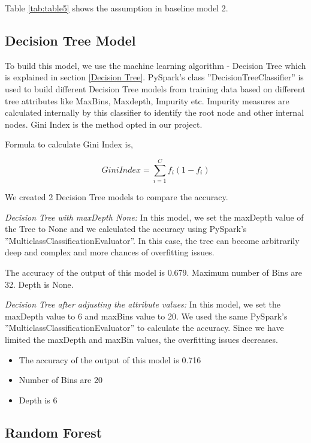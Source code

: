 \documentclass[sigconf]{acmart}
\begin{document}
Table \ref{tab:table5} shows the assumption in baseline model 2.

\subsection{Decision Tree Model}

To build this model, we use the machine learning algorithm - Decision Tree which is explained in section \ref{Decision Tree}. PySpark's class ''DecisionTreeClassifier'' is used to build different Decision Tree models from training data based on different tree attributes like MaxBins, Maxdepth, Impurity etc. Impurity measures are calculated internally by this classifier to identify the root node and other internal nodes. Gini Index is the method opted in our project.

Formula to calculate Gini Index is,

\begin{equation}
Gini Index = \sum_{i=1}^Cf_i(1-{f_i})
\end{equation}

We created 2 Decision Tree models to compare the accuracy.

\textit{Decision Tree with maxDepth None:} In this model, we set the maxDepth value of the Tree to None and we calculated the accuracy using PySpark's ''MulticlassClassificationEvaluator''. In this case, the tree can become arbitrarily deep and complex and more chances of overfitting issues.

The accuracy of the output of this model is 0.679. Maximum number of Bins are 32. Depth is None.

\textit{Decision Tree after adjusting the attribute values:} In this model, we set the maxDepth value to 6 and maxBins value to 20. We used the same PySpark's ''MulticlassClassificationEvaluator'' to calculate the accuracy. Since we have limited the maxDepth and maxBin values, the overfitting issues decreases.

\begin{itemize}
   \item The accuracy of the output of this model is 0.716
   \item Number of Bins are 20
   \item Depth is 6
\end{itemize}

\subsection{Random Forest}
\end{document}
